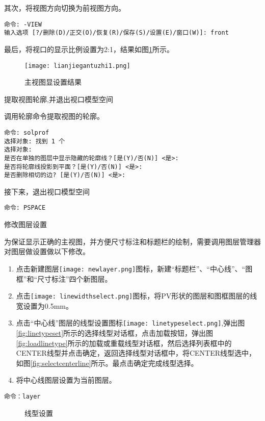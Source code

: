 \begin{procedure}
其次，将视图方向切换为前视图方向。
\begin{lstlisting}
命令: -VIEW
输入选项 [?/删除(D)/正交(O)/恢复(R)/保存(S)/设置(E)/窗口(W)]: front
\end{lstlisting}

最后，将视口的显示比例设置为2:1，结果如图\ref{fig:lianjiegantuzhi1}所示。
\begin{figure}[htbp]
\centering
\texttt{[image: lianjiegantuzhi1.png]}
\caption{主视图显设置结果}\label{fig:lianjiegantuzhi1}
\end{figure}
\item 提取视图轮廓,并退出视口模型空间

调用轮廓命令提取视图的轮廓。
\begin{lstlisting}
命令: solprof
选择对象: 找到 1 个
选择对象:
是否在单独的图层中显示隐藏的轮廓线？[是(Y)/否(N)] <是>:
是否将轮廓线投影到平面？[是(Y)/否(N)] <是>:
是否删除相切的边? [是(Y)/否(N)] <是>:
\end{lstlisting}

接下来，退出视口模型空间
\begin{lstlisting}
命令: PSPACE
\end{lstlisting}
\item 修改图层设置

为保证显示正确的主视图，并方便尺寸标注和标题栏的绘制，需要调用图层管理器对图层做设置做以下修改。

\begin{enumerate}
\item 点击新建图层\texttt{[image: newlayer.png]}图标，新建“标题栏”、“中心线”、“图框”和“尺寸标注”四个新图层。
\item 点击\texttt{[image: linewidthselect.png]}图标，将PV形状的图层和图框图层的线宽设置为0.5mm。
\item 点击“中心线”图层的线型设置图标\texttt{[image: linetypeselect.png]},弹出图\ref{fig:linetypeset}所示的选择线型对话框，点击加载按钮，弹出图\ref{fig:loadlinetype}所示的加载或重载线型对话框，然后选择列表框中的CENTER线型并点击确定，返回选择线型对话框中，将CENTER线型选中，如图\ref{fig:selectcenterline}所示。最点击确定完成线型选择。
\item 将中心线图层设置为当前图层。
\end{enumerate}
\begin{lstlisting}
命令：layer
\end{lstlisting}
\begin{figure}[htbp]
\centering
{}\hspace{20pt}
\hspace{20pt}
\caption{线型设置}
\end{figure}


\end{procedure}
